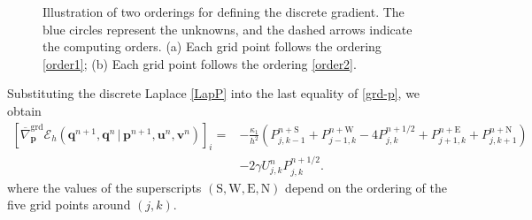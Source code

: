 \documentclass[fleqn,11pt]{elsarticle}
\numberwithin{equation}{section}
\begin{document}
\begin{figure}[H]
\begin{minipage}[t]{0.4\textwidth}

	\end{minipage}
	\caption{Illustration of two orderings for defining the discrete gradient. The blue circles represent the unknowns, and the dashed arrows indicate the computing orders. (a) Each grid point follows the ordering \eqref{order1}; (b) Each grid point follows the ordering \eqref{order2}.} \label{order}
\end{figure}


Substituting the discrete Laplace \eqref{LapP} into the last equality of \eqref{grd-p}, we obtain
\[
	\begin{aligned}
		\left[\overline{\nabla}^{\text{grd}}_{\bm p}\mathcal{E}_h(\bm q^{n+1},\bm q^{n}\,\big|\, \bm p^{n+1},\bm u^n,\bm v^n)\right]_{i}
		= & -\frac{\kappa_1}{h^2} \left(P_{j,k-1}^{n+\text{S}} + P_{j-1, k}^{n+\text{W}} - 4 P_{j,k}^{n+1/2} + P_{j+1, k}^{n+\text{E}} + P_{j, k+1}^{n+\text{N}}\right) \\
		  & - 2\gamma U_{j,k}^n P_{j,k}^{n+1/2}.
	\end{aligned}
\]
where the values of the superscripts $(\text{S}, \text{W}, \text{E}, \text{N})$ depend on the ordering of the five grid points around $(j, k)$.
\end{document}
